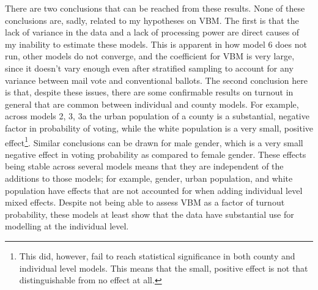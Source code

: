 \documentclass[12pt,twoside]{reedthesis}
\begin{document}
  There are two conclusions that can be reached from these results. None
  of these conclusions are, sadly, related to my hypotheses on VBM. The
  first is that the lack of variance in the data and a lack of processing
  power are direct causes of my inability to estimate these models. This
  is apparent in how model 6 does not run, other models do not converge,
  and the coefficient for VBM is very large, since it doesn't vary enough
  even after stratified sampling to account for any variance between mail
  vote and conventional ballots. The second conclusion here is that,
  despite these issues, there are some confirmable results on turnout in
  general that are common between individual and county models. For
  example, across models 2, 3, 3a the urban population of a county is a
  substantial, negative factor in probability of voting, while the white
  population is a very small, positive effect\footnote{This did, however,
    fail to reach statistical significance in both county and individual
    level models. This means that the small, positive effect is not that
    distinguishable from no effect at all.}. Similar conclusions can be
  drawn for male gender, which is a very small negative effect in voting
  probability as compared to female gender. These effects being stable
  across several models means that they are independent of the additions
  to those models; for example, gender, urban population, and white
  population have effects that are not accounted for when adding
  individual level mixed effects. Despite not being able to assess VBM as
  a factor of turnout probability, these models at least show that the
  data have substantial use for modelling at the individual level.
  
\end{document}
